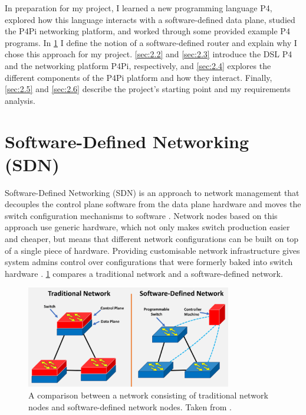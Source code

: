 



\label{sec:2}
In preparation for my project, I learned a new programming language P4, explored how this language interacts with a software-defined data plane, studied the P4Pi networking platform, and worked through some provided example P4 programs. In \cref{sec:2.1} I define the notion of a software-defined router and explain why I chose this approach for my project. \cref{sec:2.2} and \cref{sec:2.3} introduce the DSL P4 and the networking platform P4Pi, respectively, and \cref{sec:2.4} explores the different components of the P4Pi platform and how they interact. Finally, \cref{sec:2.5} and \cref{sec:2.6} describe the project's starting point and my requirements analysis.



\section{Software-Defined Networking (SDN)}
\label{sec:2.1}

Software-Defined Networking (SDN) is an approach to network management that decouples the control plane software from the data plane hardware and moves the switch configuration mechanisms to software \cite{SDNPaper}. Network nodes based on this approach use generic hardware, which not only makes switch production easier and cheaper, but means that different network configurations can be built on top of a single piece of hardware. Providing customisable network infrastructure gives system admins control over configurations that were formerly baked into switch hardware \cite{SDN}. \cref{fig:prep-sdn} compares a traditional network and a software-defined network.

\begin{figure}[htbp]
  \centering
    \includegraphics[width=0.8\textwidth]{figures/preparation/sdn.jpg}
     \caption{A comparison between a network consisting of traditional network \\ nodes and software-defined network nodes. Taken from \cite{SDNImage}.}
     \label{fig:prep-sdn}
\end{figure}

